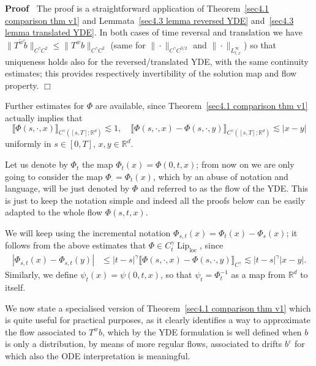\documentclass[10pt]{article}
\newcommand{\tmop}[1]{\ensuremath{\operatorname{#1}}}
\newenvironment{proof}{\noindent\textbf{Proof\ }}{\hspace*{\fill}$\Box$\medskip}
\begin{document}
\begin{proof}
  The proof is a straightforward application of Theorem~\ref{sec4.1 comparison
  thm v1} and Lemmata~\ref{sec4.3 lemma reversed YDE} and~\ref{sec4.3 lemma
  translated YDE}. In both cases of time reversal and translation we have $\|
  T^{\tilde{w}} \tilde{b} \|_{C^{\gamma} C^2} \leqslant \| T^w b
  \|_{C^{\gamma} C^2}$ (same for $\| \cdot \|_{C^{\gamma} C^{3 / 2}}$ and $\|
  \cdot \|_{L^{\infty}_{t, x}}$) so that uniqueness holds also for the
  reversed/translated YDE, with the same continuity estimates; this provides
  respectively invertibility of the solution map and flow property.
\end{proof}

Further estimates for $\Phi$ are available, since Theorem~\ref{sec4.1
comparison thm v1} actually implies that
\[ \llbracket \Phi (s, \cdot, x) \rrbracket_{C^{\gamma} ([s, T] ;
   \mathbb{R}^d)} \lesssim 1, \quad \llbracket \Phi (s, \cdot, x) - \Phi (s,
   \cdot, y) \rrbracket_{C^{\gamma} ([s, T] ; \mathbb{R}^d)} \lesssim | x - y
   | \]
uniformly in $s \in [0, T]$, $x, y \in \mathbb{R}^d$.

Let us denote by $\Phi_t$ the map $\Phi_t (x) = \Phi (0, t, x)$; from now on
we are only going to consider the map $\Phi_{\cdot} = \Phi_t (x)$, which by an
abuse of notation and language, will be just denoted by $\Phi$ and referred to
as the flow of the YDE. This is just to keep the notation simple and indeed
all the proofs below can be easily adapted to the whole flow $\Phi (s, t, x)$.

We will keep using the incremental notation $\Phi_{s, t} (x) = \Phi_t (x) -
\Phi_s (x)$; it follows from the above estimates that $\Phi \in C^{\gamma}_t
\tmop{Lip}_{\tmop{loc}}$, since
%
\begin{align*}
  | \Phi_{s, t} (x) - \Phi_{s, t} (y) | & \leqslant | t - s |^{\gamma}
  \llbracket \Phi (s, \cdot, x) - \Phi (s, \cdot, y) \rrbracket_{C^{\gamma}}
  \lesssim | t - s |^{\gamma} | x - y | .
\end{align*}
%
Similarly, we define $\psi_t (x) = \psi (0, t, x)$, so that $\psi_t =
\Phi_t^{- 1}$ as a map from $\mathbb{R}^d$ to itself.

We now state a specialised version of Theorem~\ref{sec4.1 comparison thm v1}
which is quite useful for practical purposes, as it clearly identifies a way
to approximate the flow associated to $T^w b$, which by the YDE formulation is
well defined when $b$ is only a distribution, by means of more regular flows,
associated to drifts $b^{\varepsilon}$ for which also the ODE interpretation
is meaningful.
\end{document}
